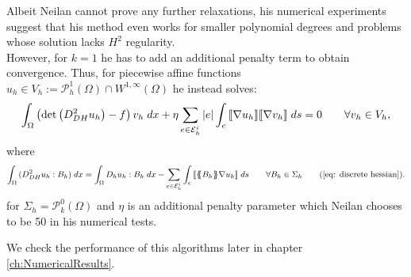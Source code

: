 Albeit Neilan cannot prove any further relaxations, his numerical experiments suggest that his method even works for smaller polynomial degrees and problems whose solution lacks $H^2$ regularity. 
\\However, for $k=1$ he has to add an additional penalty term to obtain convergence. Thus, for piecewise affine functions $u_h \in V_h :=\mathcal P_h^1(\Omega) \cap W^{1,\infty}(\Omega)$ he instead solves:
\begin{align}
		\int_{\Omega} {{ \left(\det{\left(D_{DH}^2 u_h\right)} - f \right) v_h}\;dx} 
			+ \eta \sum_{e \in \mathcal{E}_h^i} |e| \int_{e} {{ \llbracket  \nabla u_h \rrbracket \llbracket \nabla v_h \rrbracket}\;ds}
		= 0 \qquad \forall v_h \in V_h, \label{eq: neilan eq1 + jump}
\end{align}
where
	\begin{align*}
		\myIntX  \Omega { (D_{DH}^2 u_h : B_h) }
		= \myIntX  \Omega { D_h u_h: B_h}
			 -\sum_{ e \in \edgesi} \myIntS e {  \jump {\average {B_h} \nabla u_h }}\qquad \forall B_h \in \Sigma_h \tag{\ref{eq: discrete hessian}}.
	\end{align*}
for $\Sigma_h = \mathcal P^0_k(\Omega)$ and $\eta$ is an additional penalty parameter which Neilan chooses to be 50 in his numerical tests.

We check the performance of this algorithms later in chapter \ref{ch:NumericalResults}.
